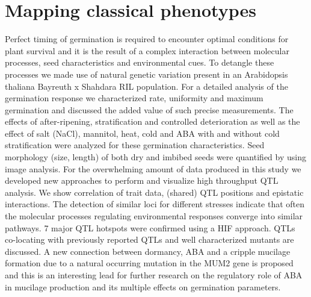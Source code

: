 \section{Mapping classical phenotypes}
Perfect timing of germination is required to encounter optimal conditions for plant survival and it 
is the result of a complex interaction between molecular processes, seed characteristics and 
environmental cues. To detangle these processes we made use of natural genetic variation present in 
an Arabidopsis thaliana Bayreuth x Shahdara RIL population. For a detailed analysis of the germination 
response we characterized rate, uniformity and maximum germination and discussed the added value of 
such precise measurements. The effects of after-ripening, stratification and controlled deterioration 
as well as the effect of salt (NaCl), mannitol, heat, cold and ABA with and without cold stratification 
were analyzed for these germination characteristics. Seed morphology (size, length) of both dry and 
imbibed seeds were quantified by using image analysis. For the overwhelming amount of data produced 
in this study we developed new approaches to perform and visualize high throughput QTL analysis. 
We show correlation of trait data, (shared) QTL positions and epistatic interactions. The detection 
of similar loci for different stresses indicate that often the molecular processes regulating 
environmental responses converge into similar pathways. 7 major QTL hotspots were confirmed using a 
HIF approach. QTLs co-locating with previously reported QTLs and well characterized mutants are 
discussed. A new connection between dormancy, ABA and a cripple mucilage formation due to a natural 
occurring mutation in the MUM2 gene is proposed and this is an interesting lead for further research 
on the regulatory role of ABA in mucilage production and its multiple effects on germination parameters.

